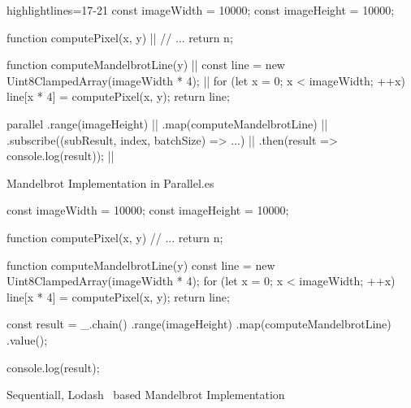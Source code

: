 \begin{listing}
	\begin{javascriptcode*}{highlightlines={17-21}}
const imageWidth = 10000;
const imageHeight = 10000;

function computePixel(x, y) { |$\label{code:mandelbrot-compute-pixel}$|
	// ...
	return n;
}

function computeMandelbrotLine(y) { |$\label{code:parallel-es-operation}$|
	const line = new Uint8ClampedArray(imageWidth * 4); |$\label{code:mandelbrot-reference1-imageWidth}$|
	for (let x = 0; x < imageWidth; ++x) {
		line[x * 4] = computePixel(x, y);
	}
	return line;
}

parallel
	.range(imageHeight) |$\label{code:parallel-es-definition-start}$|
	.map(computeMandelbrotLine)	 |$\label{code:parallel-es-map}$|
	.subscribe((subResult, index, batchSize) => ...) |$\label{code:parallel-es-subscribe}$|
	.then(result => console.log(result)); |$\label{code:parallel-es-start}$|
	\end{javascriptcode*}
	
	\caption{Mandelbrot Implementation in Parallel.es}
	\label{code:mandelbrot-parallel.es}
\end{listing}


\begin{listing}
	
	\begin{javascriptcode}
const imageWidth = 10000;
const imageHeight = 10000;

function computePixel(x, y) {
	// ...
	return n;
}

function computeMandelbrotLine(y) {
	const line = new Uint8ClampedArray(imageWidth * 4);
	for (let x = 0; x < imageWidth; ++x) {
		line[x * 4] = computePixel(x, y);
	}
	return line;
}

const result = _.chain()
	.range(imageHeight)
	.map(computeMandelbrotLine)
	.value();
	
console.log(result);
\end{javascriptcode}
\caption{Sequentiall, Lodash~\cite{lodash} based Mandelbrot Implementation}
\label{fig:mandelbrot-sync}
\end{listing}